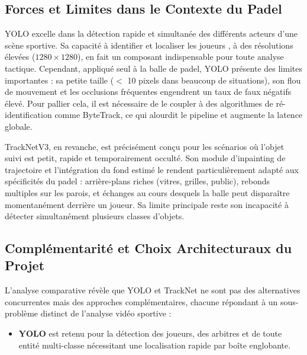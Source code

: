\begin{itemize}
\subsection{Forces et Limites dans le Contexte du Padel}

YOLO excelle dans la détection rapide et simultanée des différents acteurs d'une scène
sportive. Sa capacité à identifier et localiser les joueurs , à des
résolutions élevées ($1280 \times 1280$), en fait un composant indispensable pour
toute analyse tactique. Cependant, appliqué seul à la balle de padel, YOLO présente
des limites importantes : sa petite taille ($<$ 10 pixels dans beaucoup de situations),
son flou de mouvement et les occlusions fréquentes engendrent un taux de faux négatifs
élevé. Pour pallier cela, il est nécessaire de le coupler à des algorithmes de
ré-identification comme ByteTrack, ce qui alourdit le pipeline et augmente la latence
globale.

TrackNetV3, en revanche, est précisément conçu pour les scénarios où l'objet suivi est
petit, rapide et temporairement occulté. Son module d'inpainting de trajectoire et
l'intégration du fond estimé le rendent particulièrement adapté aux spécificités du
padel : arrière-plans riches (vitres, grilles, public), rebonds multiples sur les
parois, et échanges au cours desquels la balle peut disparaître momentanément derrière
un joueur. Sa limite principale reste son incapacité à détecter simultanément plusieurs
classes d'objets.

\subsection{Complémentarité et Choix Architecturaux du Projet}

L'analyse comparative révèle que YOLO et TrackNet ne sont pas des alternatives
concurrentes mais des approches complémentaires, chacune répondant à un sous-problème
distinct de l'analyse vidéo sportive :

\begin{itemize}
    \item \textbf{YOLO} est retenu pour la détection des joueurs, des arbitres et de
    toute entité multi-classe nécessitant une localisation rapide par boîte englobante.


\end{itemize}
\end{itemize}
